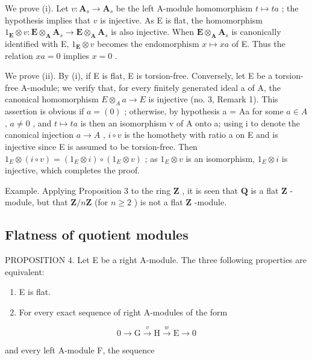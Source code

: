 We prove (i). Let \(v: \mathbf{A}_s \to \mathbf{A}_s\) be the left A-module homomorphism \(t \mapsto ta\) ; the hypothesis implies that \(v\) is injective. As E is flat, the homomorphism \(1_{\mathbf{E}} \otimes v: \mathbf{E} \otimes_{\mathbf{A}} \mathbf{A}_s \to \mathbf{E} \otimes_{\mathbf{A}} \mathbf{A}_s\) is also injective. When \(\mathbf{E} \otimes_{\mathbf{A}} \mathbf{A}_s\) is canonically identified with E, \(1_{\mathbf{E}} \otimes v\) becomes the endomorphism \(x \mapsto xa\) of E. Thus the relation \(xa = 0\) implies \(x = 0\) .

We prove (ii). By (i), if E is flat, E is torsion-free. Conversely, let E be a torsion-free A-module; we verify that, for every finitely generated ideal a of A, the canonical homomorphism \(E \otimes_{A} a \to E\) is injective (no. 3, Remark 1). This assertion is obvious if \(a = (0)\) ; otherwise, by hypothesis a = Aa for some \(a \in A\) , \(a \neq 0\) , and \(t \mapsto ta\) is then an isomorphism v of A onto a; using i to denote the canonical injection \(a \to A\) , \(i \circ v\) is the homothety with ratio a on E and is injective since E is assumed to be torsion-free. Then \(1_{E} \otimes (i \circ v) = (1_{E} \otimes i) \circ (1_{E} \otimes v)\) ; as \(1_{E} \otimes v\) is an isomorphism, \(1_{E} \otimes i\) is injective, which completes the proof.

Example. Applying Proposition 3 to the ring \(\mathbf{Z}\) , it is seen that \(\mathbf{Q}\) is a flat \(\mathbf{Z}\) -module, but that \(\mathbf{Z}/n\mathbf{Z}\) (for \(n \geqslant 2\) ) is not a flat \(\mathbf{Z}\) -module.

\subsection{Flatness of quotient modules}

PROPOSITION 4. Let E be a right A-module. The three following properties are equivalent:

\begin{enumerate}
\def\labelenumi{(\alph{enumi})}
\item
  E is flat.
\item
  For every exact sequence of right A-modules of the form
\end{enumerate}

\[
0 \longrightarrow \mathrm{G} \stackrel {v} {\longrightarrow} \mathrm{H} \stackrel {w} {\longrightarrow} \mathrm{E} \longrightarrow 0\tag{1}
\]

and every left A-module F, the sequence


